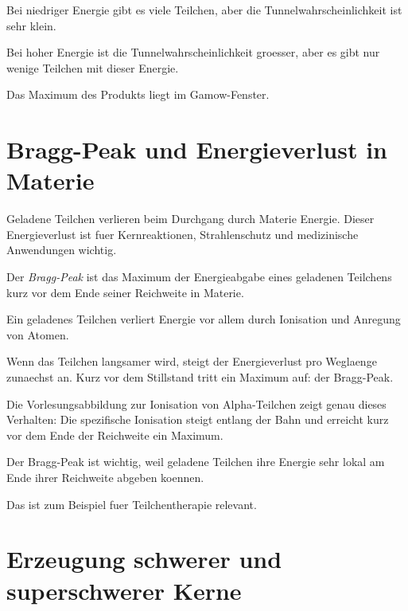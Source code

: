 \begin{conceptbox}
Bei niedriger Energie gibt es viele Teilchen, aber die Tunnelwahrscheinlichkeit ist
sehr klein.

Bei hoher Energie ist die Tunnelwahrscheinlichkeit groesser, aber es gibt nur wenige
Teilchen mit dieser Energie.

Das Maximum des Produkts liegt im Gamow-Fenster.
\end{conceptbox}

\section{Bragg-Peak und Energieverlust in Materie}

Geladene Teilchen verlieren beim Durchgang durch Materie Energie.
Dieser Energieverlust ist fuer Kernreaktionen, Strahlenschutz und medizinische
Anwendungen wichtig.

\begin{definitionbox}
Der \emph{Bragg-Peak} ist das Maximum der Energieabgabe eines geladenen Teilchens
kurz vor dem Ende seiner Reichweite in Materie.
\end{definitionbox}

\begin{conceptbox}
Ein geladenes Teilchen verliert Energie vor allem durch Ionisation und Anregung
von Atomen.

Wenn das Teilchen langsamer wird, steigt der Energieverlust pro Weglaenge zunaechst an.
Kurz vor dem Stillstand tritt ein Maximum auf: der Bragg-Peak.
\end{conceptbox}

\begin{notebox}
Die Vorlesungsabbildung zur Ionisation von Alpha-Teilchen zeigt genau dieses Verhalten:
Die spezifische Ionisation steigt entlang der Bahn und erreicht kurz vor dem Ende
der Reichweite ein Maximum.
\end{notebox}

\begin{examtipbox}
Der Bragg-Peak ist wichtig, weil geladene Teilchen ihre Energie sehr lokal am Ende
ihrer Reichweite abgeben koennen.

Das ist zum Beispiel fuer Teilchentherapie relevant.
\end{examtipbox}

\section{Erzeugung schwerer und superschwerer Kerne}

